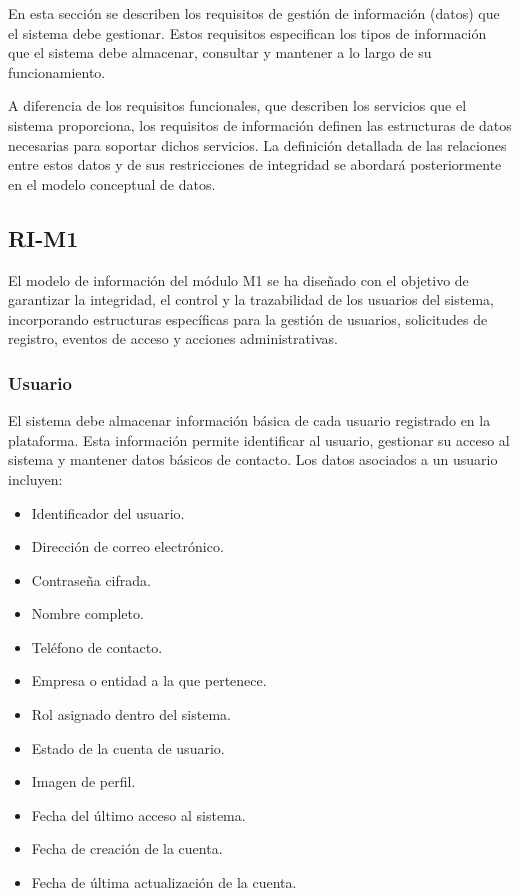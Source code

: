 En esta sección se describen los requisitos de gestión de información (datos) que el sistema debe gestionar. Estos requisitos especifican los tipos de información que el sistema debe almacenar, consultar y mantener a lo largo de su funcionamiento.

A diferencia de los requisitos funcionales, que describen los servicios que el sistema proporciona, los requisitos de información definen las estructuras de datos necesarias para soportar dichos servicios. La definición detallada de las relaciones entre estos datos y de sus restricciones de integridad se abordará posteriormente en el modelo conceptual de datos.

\subsection{RI-M1}

El modelo de información del módulo M1 se ha diseñado con el objetivo de garantizar la integridad, el control y la trazabilidad de los usuarios del sistema, incorporando estructuras específicas para la gestión de usuarios, solicitudes de registro, eventos de acceso y acciones administrativas.

\subsubsection*{Usuario}

El sistema debe almacenar información básica de cada usuario registrado en la plataforma. Esta información permite identificar al usuario, gestionar su acceso al sistema y mantener datos básicos de contacto. Los datos asociados a un usuario incluyen:

\begin{itemize}
    \item Identificador del usuario.
    \item Dirección de correo electrónico.
    \item Contraseña cifrada.
    \item Nombre completo.
    \item Teléfono de contacto.
    \item Empresa o entidad a la que pertenece.
    \item Rol asignado dentro del sistema.
    \item Estado de la cuenta de usuario.
    \item Imagen de perfil.
    \item Fecha del último acceso al sistema.
    \item Fecha de creación de la cuenta.
    \item Fecha de última actualización de la cuenta.
\end{itemize}

